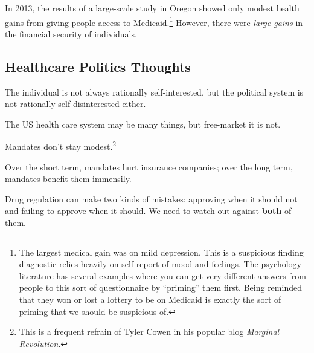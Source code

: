 In 2013, the results of a large-scale study in Oregon showed only modest health
gains from giving people access to Medicaid.\footnote{The largest medical gain
was on mild depression. This is a suspicious finding diagnostic relies heavily
on self-report of mood and feelings. The psychology literature has several
examples where you can get very different answers from people to this sort of
questionnaire by ``priming'' them first. Being reminded that they won or lost a
lottery to be on Medicaid is exactly the sort of priming that we should be
suspicious of.} However, there were \emph{large gains} in the financial
security of individuals.

\subsection{Healthcare Politics Thoughts}

\thought The individual is not always rationally self-interested, but the
political system is not rationally self-disinterested either.

\thought The US health care system may be many things, but free-market it is
not.

\thought Mandates don't stay modest.\footnote{This is a frequent refrain of
Tyler Cowen in his popular blog \emph{Marginal Revolution}.}

\thought Over the short term, mandates hurt insurance companies; over the long
term, mandates benefit them immensily.

\thought Drug regulation can make two kinds of mistakes: approving when it
should not and failing to approve when it should. We need to watch out against
\textbf{both} of them.


